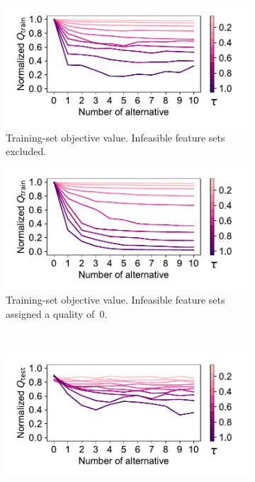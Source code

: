 \documentclass[iicol, sn-basic, Numbered]{sn-jnl} %
\theoremstyle{plain}
\theoremstyle{definition}
\begin{document}
\begin{figure}[t]
	\begin{subfigure}[t]{0.49\textwidth}
		\centering
		\includegraphics[width=\textwidth, trim=15 15 20 10, clip]{plots/afs-impact-num-alternatives-tau-train-objective-max.pdf}
		\caption{
			Training-set objective value.
			Infeasible feature sets excluded.
		}
		\label{fig:afs:impact-num-alternatives-tau-train-objective-max}
	\end{subfigure}
	\hfill
	\begin{subfigure}[t]{0.49\textwidth}
		\centering
		\includegraphics[width=\textwidth, trim=15 15 20 10, clip]{plots/afs-impact-num-alternatives-tau-train-objective-max-fillna.pdf}
		\caption{
			Training-set objective value.
			Infeasible feature sets assigned a quality of~0.
		}
		\label{fig:afs:impact-num-alternatives-tau-train-objective-max-fillna}
	\end{subfigure}
	\\
	\begin{subfigure}[t]{0.49\textwidth}
		\centering
		\includegraphics[width=\textwidth, trim=15 15 20 10, clip]{plots/afs-impact-num-alternatives-tau-test-objective-max.pdf}

\end{subfigure}
\end{figure}
\end{document}

